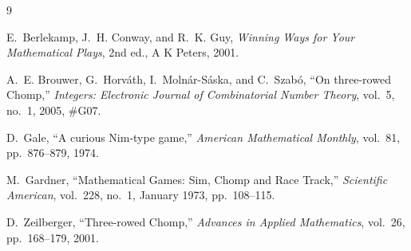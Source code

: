 \documentclass[12pt]{article}
\begin{document}
\begin{thebibliography}{9}

E.~Berlekamp, J.~H. Conway, and R.~K. Guy,
\textit{Winning Ways for Your Mathematical Plays}, 2nd ed.,
A K Peters, 2001.

A.~E. Brouwer, G.~Horv{\'a}th, I.~Moln{\'a}r-S{\'a}ska,
and C.~Szab{\'o},
``On three-rowed Chomp,''
\textit{Integers: Electronic Journal of Combinatorial Number Theory},
vol.~5, no.~1, 2005, \#G07.

D.~Gale,
``A curious Nim-type game,''
\textit{American Mathematical Monthly}, vol.~81, pp.~876--879, 1974.

M.~Gardner,
``Mathematical Games: Sim, Chomp and Race Track,''
\textit{Scientific American}, vol.~228, no.~1, January 1973, pp.~108--115.

D.~Zeilberger,
``Three-rowed Chomp,''
\textit{Advances in Applied Mathematics}, vol.~26, pp.~168--179, 2001.

\end{thebibliography}
\end{document}
